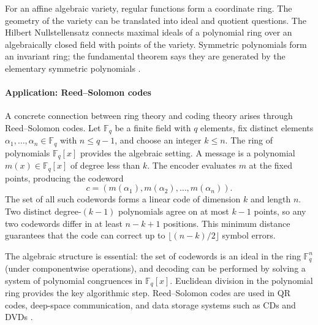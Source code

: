 For an affine algebraic variety, regular functions form a coordinate ring. The geometry of the variety can be translated into ideal and quotient questions. The Hilbert Nullstellensatz connects maximal ideals of a polynomial ring over an algebraically closed field with points of the variety. Symmetric polynomials form an invariant ring; the fundamental theorem says they are generated by the elementary symmetric polynomials \cite{ring_ref4}.

\paragraph{Application: Reed--Solomon codes}
A concrete connection between ring theory and coding theory arises through Reed--Solomon codes. Let $\mathbb F_q$ be a finite field with $q$ elements, fix distinct elements $\alpha_1,\ldots,\alpha_n\in\mathbb F_q$ with $n\le q-1$, and choose an integer $k\le n$. The ring of polynomials $\mathbb F_q[x]$ provides the algebraic setting. A message is a polynomial $m(x)\in\mathbb F_q[x]$ of degree less than $k$. The encoder evaluates $m$ at the fixed points, producing the codeword
\[
c=(m(\alpha_1),m(\alpha_2),\ldots,m(\alpha_n)).
\]
The set of all such codewords forms a linear code of dimension $k$ and length $n$. Two distinct degree-$(k{-}1)$ polynomials agree on at most $k{-}1$ points, so any two codewords differ in at least $n{-}k{+}1$ positions. This minimum distance guarantees that the code can correct up to $\lfloor(n{-}k)/2\rfloor$ symbol errors.

The algebraic structure is essential: the set of codewords is an ideal in the ring $\mathbb F_q^n$ (under componentwise operations), and decoding can be performed by solving a system of polynomial congruences in $\mathbb F_q[x]$. Euclidean division in the polynomial ring provides the key algorithmic step. Reed--Solomon codes are used in QR codes, deep-space communication, and data storage systems such as CDs and DVDs \cite{ring_ref1}.

